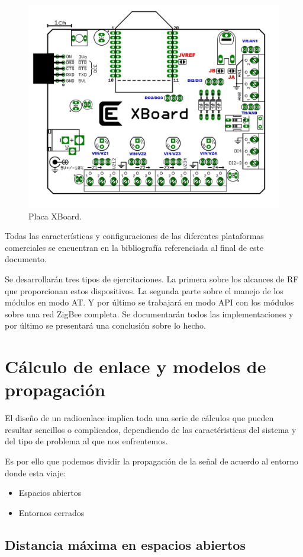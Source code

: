 \documentclass[11pt,oneside,spanish,a4paper]{article}
\begin{document}
\begin{figure}[ht]
  \centering
  \includegraphics[width=.6\textwidth]{img/xboard}
  \caption{Placa XBoard.}
  \label{fig:xboard}
\end{figure}

Todas las características y configuraciones de las diferentes
plataformas comerciales  se encuentran en la bibliografía referenciada
al final de este documento. 

Se desarrollarán tres tipos de ejercitaciones. La primera sobre los
alcances de RF que proporcionan estos dispositivos. La segunda parte
sobre el manejo de los módulos en modo AT. Y por último se trabajará
en modo API con los módulos sobre una red ZigBee completa. Se
documentarán todos las implementaciones y por último se presentará una
conclusión sobre lo hecho.

\section{C\'alculo de enlace y modelos de propagaci\'on}
\label{S:1}


El dise\~no de un radioenlace implica toda una serie de c\'alculos que pueden resultar sencillos o complicados, dependiendo de las caract\'eristicas del sistema y del tipo de problema al que nos enfrentemos.

Es por ello que podemos dividir la propagaci\'on de la se\~nal de acuerdo al entorno donde esta viaje: 

\begin{itemize}
	\item Espacios abiertos 
	\item Entornos cerrados
\end{itemize}


\subsection{Distancia m\'axima en espacios abiertos}
\end{document}

